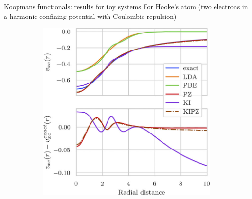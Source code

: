 \documentclass[xcolor=table,aspectratio=169]{beamer}
\numberwithin{equation}{section}
\begin{document}
\begin{frame}{Koopmans functionals: results for toy systems}
   For Hooke's atom (two electrons in a harmonic confining potential with Coulombic repulsion)

   \begin{figure}[t]
      \begin{subfigure}{0.4\textwidth}
         \includegraphics[width=\columnwidth]{figures/schubert_vxc.jpeg}
      \end{subfigure}
      \begin{subfigure}{0.4\textwidth}
      \end{subfigure}
   \end{figure}


\end{frame}
\end{document}
